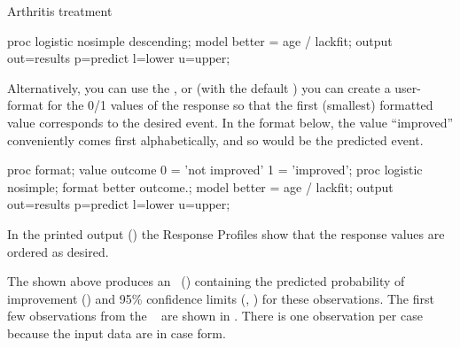 \begin{Example}[arthrit7]{Arthritis treatment}
\begin{listing}
proc logistic nosimple descending;
   model  better = age / lackfit;
   output out=results p=predict l=lower u=upper;
\end{listing}
Alternatively, you can use the , or
(with the default )
you can create a user-format for the 0/1 values of the
response so that the first (smallest) formatted value corresponds
to the desired event.  In the format  below, the value
``improved'' conveniently comes first alphabetically,
and so would be the predicted event.
\begin{listing}
proc format;
   value outcome 0 = 'not improved'
                 1 = 'improved';
proc logistic nosimple;
   format better outcome.;
   model  better = age / lackfit;
   output out=results p=predict l=lower u=upper;
\end{listing}
In the printed output
() the Response Profiles show that the response
values are ordered as desired.

\begin{Output}[htbp]
\caption{Arthritis treatment data: Logistic regression on age}\label{out:logist1c.1}
\small

\end{Output}
The  shown above
produces an \ODS\ () containing the predicted probability of
improvement () and 95\% confidence limits
(, ) for these observations.
The first few observations from the \Dset\ 
are shown in .
There is one observation per case because the input data are in case form.

\begin{Output}[htb]
\caption{Arthritis treatment data: RESULTS \Dset\ (partial)}\label{out:logist1c.2}
\small

\end{Output}


\end{Example}

